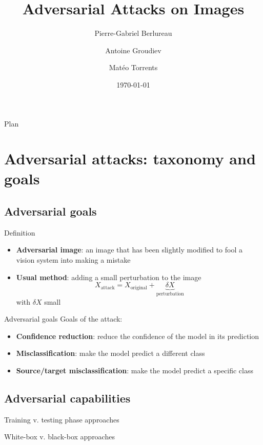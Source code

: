 \documentclass[aspectratio=169]{beamer}
\title{\textbf{Adversarial Attacks on Images}}
\author{Pierre-Gabriel Berlureau\and Antoine Groudiev\and Matéo Torrents}
\date{\today}
\theoremstyle{definition}
\begin{document}
\frame{\titlepage}

\begin{frame}{Plan}
   \tableofcontents
\end{frame}

\section{Adversarial attacks: taxonomy and goals}
\subsection{Adversarial goals}
\begin{frame}{Definition}
  \begin{itemize}
    \item \textbf{Adversarial image}: an image that has been slightly modified to fool a vision system into making a mistake
    \item \textbf{Usual method}: adding a small perturbation to the image
    \begin{equation*}
      X_{\text{attack}} = X_{\text{original}} + \underbrace{\delta X}_{\text{perturbation}}
    \end{equation*}
    with $\delta X$ small
  \end{itemize}
\end{frame}
\begin{frame}{Adversarial goals}
Goals of the attack:
\begin{itemize}
  \item \textbf{Confidence reduction}: reduce the confidence of the model in its prediction
  \item \textbf{Misclassification}: make the model predict a different class
  \item \textbf{Source/target misclassification}: make the model predict a specific class
\end{itemize}
\end{frame}
\subsection{Adversarial capabilities}
\begin{frame}{Training v. testing phase approaches}
  
\end{frame}

\begin{frame}{White-box v. black-box approaches}
  
\end{frame}
\end{document}
